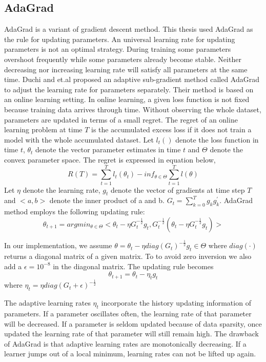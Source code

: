 \subsection{AdaGrad}
\label{subsec:AdaGrad}
AdaGrad is a variant of gradient descent method. This thesis used AdaGrad as the rule for updating parameters. An universal learning rate for updating parameters is not an optimal strategy. During training some parameters overshoot frequently while some parameters already become stable. Neither decreasing nor increasing learning rate will satisfy all parameters at the same time. Duchi and et.al \cite{adagrad}  proposed an adaptive sub-gradient method called AdaGrad to adjust the learning rate for parameters separately. Their method is based on an online learning setting. In online learning, a given loss function is not fixed because training data arrives through time. Without observing the whole dataset, parameters are updated in terms of a small regret. The regret of an online learning problem at time $T$ is the accumulated excess loss if it does not train a model with the whole accumulated dataset. Let $l_t()$ denote the loss function in time $t$, $\theta_t$ denote the vector parameter estimates in time $t$ and $\Theta$ denote the convex parameter space. The regret is expressed in equation below,
\begin{equation}
R(T)=\sum_{t=1}^Tl_t(\theta_t)-inf_{\theta\in\Theta}\sum_{t=1}^Tl(\theta)
\end{equation}
Let $\eta$ denote the learning rate, $g_t$ denote the vector of gradients at time step $T$ and $<a,b>$ denote the inner product of a and b.  $G_t=\sum_{k=0}^Tg_kg_k^{'}$. AdaGrad method employs the following updating rule:
\begin{equation}
\theta_{t+1}=argmin_{\theta\in\Theta}<\theta_t-\eta G_t^{-\frac{1}{2}}g_t,G_t^{-\frac{1}{2}}(\theta_t-\eta G_t^{-\frac{1}{2}}g_t)>
\end{equation}

In our implementation, we assume $\theta=\theta_t-\eta diag(G_t)^{-\frac{1}{2}}g_t\in\Theta$ where $diag(\cdot)$ returns a diagonal matrix of a given matrix. To to avoid zero inversion we also add a $\epsilon=10^{-8}$ in the diagonal matrix. The updating rule becomes
\begin{equation}
\theta_{t+1}=\theta_t-\eta_t g_t  
\end{equation}
where $\eta_t = \eta diag(G_t+\epsilon)^{-\frac{1}{2}}$

The adaptive learning rates $\eta_t$ incorporate the history updating information of  parameters. If a parameter oscillates often, the learning rate of that parameter will be decreased. If a parameter is seldom updated because of data sparsity, once updated the learning rate of that parameter will still remain high. The drawback of AdaGrad is that adaptive learning rates are monotonically decreasing. If a learner jumps out of a local minimum, learning rates can not be lifted up again.  




